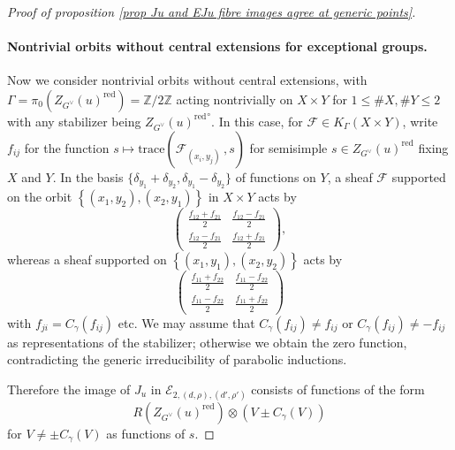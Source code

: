 \documentclass[10pt]{article}
\newcommand{\sett}[1]{\left\{#1\right\}}
\newcommand{\Ff}{\mathcal{F}}
\newcommand{\Ee}{\mathcal{E}}
\newcommand{\trace}[2]{\mathrm{trace}\left({#1}\,,{#2}\right)}
\newcommand{\Z}{\mathbb{Z}}
\theoremstyle{definition}
\theoremstyle{remark}
\newcommand{\Zur}{Z_{G^\vee}(u)^{\mathrm{red}}}
\begin{document}
\begin{proof}[Proof of proposition \ref{prop Ju and EJu fibre images agree at generic points}]
\paragraph{Nontrivial orbits without central extensions for exceptional groups.}
Now we consider nontrivial orbits without central extensions, with $\Gamma=\pi_0(\Zur)=\Z/2\Z$ acting nontrivially on $X\times Y$ for $1\leq \#X, \#Y\leq 2$ with any stabilizer being ${\Zur}^\circ$. 
In this case, for $\Ff\in K_{\Gamma}(X\times Y)$, write $f_{ij}$ 
for the function $s\mapsto\trace{\Ff_{(x_i,y_j)}}{s}$ for semisimple 
$s\in\Zur$ fixing $X$ and $Y$. In the basis $\{\delta_{y_1}+\delta_{y_2}, \delta_{y_1}-\delta_{y_2}\}$ of functions on $Y$, a sheaf $\Ff$ supported
on the orbit $\sett{(x_1,y_2),(x_2,y_1)}$ in $X\times Y$ acts by 
%
\[
\begin{pmatrix}
\frac{f_{12}+f_{21}}{2} & \frac{f_{12}-f_{21}}{2}\\
\frac{f_{12}-f_{21}}{2} & \frac{f_{12}+f_{21}}{2}
\end{pmatrix},
\]
%
whereas a sheaf supported on $\sett{(x_1,y_1),(x_2,y_2)}$ acts by 
%
\[
\begin{pmatrix}
\frac{f_{11}+f_{22}}{2} & \frac{f_{11}-f_{22}}{2}\\
\frac{f_{11}-f_{22}}{2} & \frac{f_{11}+f_{22}}{2}
\end{pmatrix}
\]
%
with $f_{ji}=C_{\gamma}(f_{ij})$ etc. We may assume that
$C_\gamma(f_{ij})\neq f_{ij}$ or $C_\gamma(f_{ij})\neq -f_{ij}$  as representations of the stabilizer; otherwise 
we obtain the zero function, contradicting the generic irreducibility of parabolic inductions. 

Therefore the image of $J_u$ in 
$\Ee_{2,(d,\rho),(d',\rho')}$ consists of functions of the form
%
\begin{equation}
\label{eqn matrix coeff a priori no extension exceptional}
R(\Zur)\otimes\left(V\pm C_\gamma(V)\right)
\end{equation}
%
for $V\neq \pm C_\gamma(V)$ as functions of $s$.



\end{proof}
\end{document}
